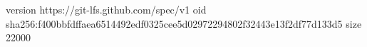 version https://git-lfs.github.com/spec/v1
oid sha256:f400bbfdffaea6514492edf0325cee5d02972294802f32443e13f2df77d133d5
size 22000
